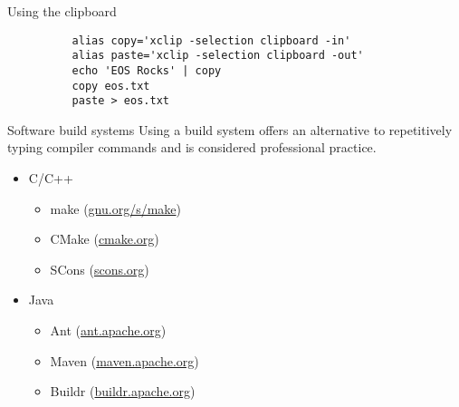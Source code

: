\documentclass[8pt]{beamer}
\begin{document}
\begin{frame}[fragile]{}
\begin{columns}
\begin{column}{0.33\textwidth}
\begin{block}{Using the clipboard}
\begin{verbatim}
          alias copy='xclip -selection clipboard -in'
          alias paste='xclip -selection clipboard -out'
          echo 'EOS Rocks' | copy
          copy eos.txt
          paste > eos.txt
        \end{verbatim}
      \end{block}
      \begin{block}{Software build systems}
        Using a build system offers an alternative to repetitively typing compiler commands and is considered professional practice.
        \begin{itemize}
        \item C/C++
          \begin{itemize}
          \item make (\url{gnu.org/s/make})
          \item CMake (\url{cmake.org})
          \item SCons (\url{scons.org})
          \end{itemize}
        \item Java
          \begin{itemize}
          \item Ant (\url{ant.apache.org})
          \item Maven (\url{maven.apache.org})
          \item Buildr (\url{buildr.apache.org})
          \end{itemize}
        \end{itemize}
      \end{block}
    \end{column}
  \end{columns}
\end{frame}

\end{document}
